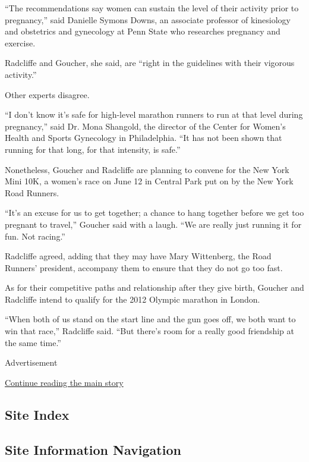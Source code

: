 ``The recommendations say women can sustain the level of their activity
prior to pregnancy,'' said Danielle Symons Downs, an associate professor
of kinesiology and obstetrics and gynecology at Penn State who
researches pregnancy and exercise.

Radcliffe and Goucher, she said, are ``right in the guidelines with
their vigorous activity.''

Other experts disagree.

``I don't know it's safe for high-level marathon runners to run at that
level during pregnancy,'' said Dr. Mona Shangold, the director of the
Center for Women's Health and Sports Gynecology in Philadelphia. ``It
has not been shown that running for that long, for that intensity, is
safe.''

Nonetheless, Goucher and Radcliffe are planning to convene for the New
York Mini 10K, a women's race on June 12 in Central Park put on by the
New York Road Runners.

``It's an excuse for us to get together; a chance to hang together
before we get too pregnant to travel,'' Goucher said with a laugh. ``We
are really just running it for fun. Not racing.''

Radcliffe agreed, adding that they may have Mary Wittenberg, the Road
Runners' president, accompany them to ensure that they do not go too
fast.

As for their competitive paths and relationship after they give birth,
Goucher and Radcliffe intend to qualify for the 2012 Olympic marathon in
London.

``When both of us stand on the start line and the gun goes off, we both
want to win that race,'' Radcliffe said. ``But there's room for a really
good friendship at the same time.''

Advertisement

\protect\hyperlink{after-bottom}{Continue reading the main story}

\hypertarget{site-index}{%
\subsection{Site Index}\label{site-index}}

\hypertarget{site-information-navigation}{%
\subsection{Site Information
Navigation}\label{site-information-navigation}}

